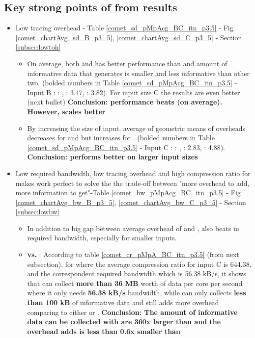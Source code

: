 \subsection{Key strong points of \parlot from results}

\begin{itemize}
\item \textsf{Low tracing overhead - Table \ref{comet_sd_pMpAcg_BC_itn_p3.5} - Fig \ref{comet_chartAvg_sd_B_p3_5}, \ref{comet_chartAvg_sd_C_p3_5} - Section \ref{subsec:lowtoh}}
	\begin{itemize}
	\item \textsf{ On average, both \parlotm and \parlota has better performance than \callgrind and amount of informative data that \callgrind generates is smaller and less informative than other two. (bolded numbers in Table \ref{comet_sd_pMpAcg_BC_itn_p3.5} - Input B :  : , \parlota : 3.47, \callgrind : 3.82). For input size C the results are even better (next bullet) \textbf{Conclusion: \parlot performance beats \callgrind (on average). However, \callgrind scales better}}
	\item \textsf{By increasing the size of input, average of geometric means of overheads decreases for \parlotm and \parlota but increases for \callgrind. (bolded numbers in Table \ref{comet_sd_pMpAcg_BC_itn_p3.5} - Input C :  : , \parlota : 2.83, \callgrind : 4.88). \textbf{Conclusion: \parlot performs better on larger input sizes}}
	\end{itemize}
\item \textsf{ Low required bandwidth, low tracing overhead and high compression ratio for makes \parlot work perfect to solve the the trade-off between "more overhead to add, more information to get"-Table \ref{comet_bw_pMpAcg_BC_itn_p3.5} - Fig \ref{comet_chartAvg_bw_B_p3_5}, \ref{comet_chartAvg_bw_C_p3_5} - Section \ref{subsec:lowbw}}
	\begin{itemize}
	\item \textsf{ In addition to big gap between average overhead of \parlotm and \callgrind, \parlotm also beats \callgrind in required bandwidth, especially for smaller inputs.}
	\item\textsf{ \textbf{\parlota vs. \callgrind}: According to table \ref{comet_cr_pMpA_BC_itn_p3.5} (from next subsection), for \parlota where the average compression ratio for input C is 644.38, and the correspondent required bandwidth which is 56.38 kB/s, it shows that \parlota can collect \textbf{more than 36 MB} worth of data per core per second where it only needs \textbf{56.38 kB/s} bandwidth, while \callgrind can only collects \textbf{less than 100 kB} of informative data and still adds more overhead comparing to either \parlota or \parlotm. \textbf{Conclusion: The amount of informative data can be collected with \parlota  are 360x larger than \callgrind and the overhead \parlota adds is less than 0.6x smaller than \callgrind}}

\end{itemize}
\end{itemize}
